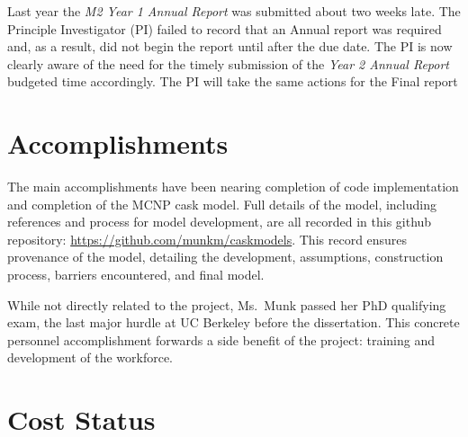 \documentclass[12pt]{article}
\begin{document}
Last year the \textit{M2 Year 1 Annual Report} was submitted about two weeks late.  
The Principle Investigator (PI) failed to record that an Annual report was required and, as a result, did not begin the report until after the due date. 
The PI is now clearly aware of the need for the timely submission of the \textit{Year 2 Annual Report} budgeted time accordingly.
The PI will take the same actions for the Final report


\section{Accomplishments}
\label{sect::accomplishments}

The main accomplishments have been nearing completion of code implementation and completion of the MCNP cask model. Full details of the model, including references and process for model development, are all recorded in this github repository: \url{https://github.com/munkm/caskmodels}. This record ensures provenance of the model, detailing the development, assumptions, construction process, barriers encountered, and final model. 

While not directly related to the project, Ms.\ Munk passed her PhD qualifying exam, the last major hurdle at UC Berkeley before the dissertation. This concrete personnel accomplishment forwards a side benefit of the project: training and development of the workforce. 


\section{Cost Status}
\label{sect::cost}
\end{document}
